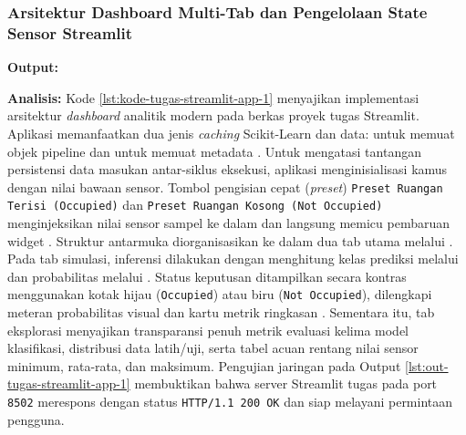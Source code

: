 \documentclass[a4paper,oneside,11pt]{book}
\begin{document}
\subsubsection{Arsitektur Dashboard Multi-Tab dan Pengelolaan State Sensor Streamlit}

\par \textbf{Output:}

\par \textbf{Analisis:} Kode \ref{lst:kode-tugas-streamlit-app-1} menyajikan implementasi arsitektur \textit{dashboard} analitik modern pada berkas  proyek tugas Streamlit. Aplikasi memanfaatkan dua jenis \textit{caching} Scikit-Learn dan data:  untuk memuat objek pipeline  dan  untuk memuat metadata . Untuk mengatasi tantangan persistensi data masukan antar-siklus eksekusi, aplikasi menginisialisasi kamus  dengan nilai bawaan sensor. Tombol pengisian cepat (\textit{preset}) \texttt{Preset Ruangan Terisi (Occupied)} dan \texttt{Preset Ruangan Kosong (Not Occupied)} menginjeksikan nilai sensor sampel ke dalam  dan langsung memicu pembaruan widget . Struktur antarmuka diorganisasikan ke dalam dua tab utama melalui . Pada tab simulasi, inferensi dilakukan dengan menghitung kelas prediksi melalui  dan probabilitas melalui . Status keputusan ditampilkan secara kontras menggunakan kotak  hijau (\texttt{Occupied}) atau  biru (\texttt{Not Occupied}), dilengkapi meteran probabilitas visual  dan kartu metrik ringkasan . Sementara itu, tab eksplorasi menyajikan transparansi penuh metrik evaluasi kelima model klasifikasi, distribusi data latih/uji, serta tabel acuan rentang nilai sensor minimum, rata-rata, dan maksimum. Pengujian jaringan pada Output \ref{lst:out-tugas-streamlit-app-1} membuktikan bahwa server Streamlit tugas pada port \texttt{8502} merespons dengan status \texttt{HTTP/1.1 200 OK} dan siap melayani permintaan pengguna.
\end{document}

